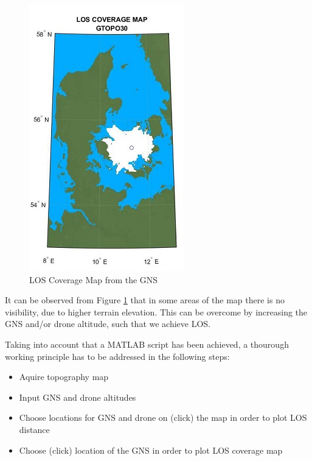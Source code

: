 \begin{figure}[h]
	\centering
	\includegraphics[scale=2.5]{figures/coverage_map.jpg}
	\caption{LOS Coverage Map from the GNS}
   	\label{fig:los_area}
\end{figure}

It can be observed from Figure \ref{fig:los_area} that in some areas of the map there is no visibility, due to higher terrain elevation. This can be overcome by increasing the GNS and/or drone altitude, such that we achieve LOS.  

Taking into account that a MATLAB script has been achieved, a thourough working principle has to be addressed in the following steps:
\begin{itemize}
	\item Aquire topography map 
	\item Input GNS and drone altitudes
	\item Choose locations for GNS and drone on (click) the map in order to plot LOS distance
	\item Choose (click) location of the GNS in order to plot LOS coverage map
\end{itemize}

